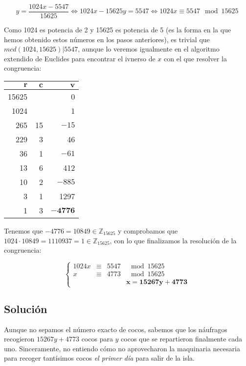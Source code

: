 \[y = \frac{1024x-5547}{15625} \iff 1024x - 15625y = 5547 \iff 1024x \equiv 5547 \mod 15625\]

Como 1024 es potencia de 2 y 15625 es potencia de 5 (es la forma en la que hemos obtenido estos números en los pasos anteriores), es trivial que $mcd(1024,15625)|5547$, aunque lo veremos igualmente en el algoritmo extendido de Euclides para encontrar el ivnerso de $x$ con el que resolver la congruencia:

\begin{center}
\begin{tabular}{r r r}
	$\boldsymbol{r}$ & $\boldsymbol{c}$ & $\boldsymbol{v}$     \\
	\toprule
	15625            &                  & 0                    \\
	 1024            &                  & 1                    \\
	 265             & 15               & $-15$                \\
	 229             & 3                & 46                   \\
	 36              & 1                & $-61$                \\
	 13              & 6                & 412                  \\
	 10              & 2                & $-885$               \\
	 3               & 1                & 1297                 \\
	 1               & 3                & $\boldsymbol{-4776}$ \\
\end{tabular}
\end{center}

Tenemos que $-4776 = 10849 \in\mathbb{Z}_{15625}$ y comprobamos que $1024 \cdot 10849 = 1110937 = 1 \in\mathbb{Z}_{15625}$, con lo que finalizamos la resolución de la congruencia:

\[
\left\{
\begin{array}{rcrl}
	1024x & \equiv & 5547 & \mod 15625 \\
	x     & \equiv & 4773 & \mod 15625 \\
         &        &      & \boldsymbol{x = 15267y + 4773}
\end{array}
\right.
\]

\subsection*{Solución}

Aunque no sepamos el número exacto de cocos, sabemos que los náufragos recogieron $15267y + 4773$ cocos para $y$ cocos que se repartieron finalmente cada uno.
Sinceramente, no entiendo cómo no aprovecharon la maquinaria necesaria para recoger tantísimos cocos \textit{el primer día} para salir de la isla.
